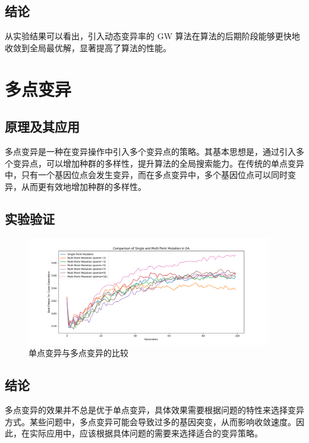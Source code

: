 \documentclass[journal=gmj]{report}%
\theoremstyle{definition}
\numberwithin{equation}{section}
\begin{document}
\subsection{结论}

从实验结果可以看出，引入动态变异率的 GW 算法在算法的后期阶段能够更快地收敛到全局最优解，显著提高了算法的性能。

\section{多点变异}

\subsection{原理及其应用}

多点变异是一种在变异操作中引入多个变异点的策略。其基本思想是，通过引入多个变异点，可以增加种群的多样性，提升算法的全局搜索能力。在传统的单点变异中，只有一个基因位点会发生变异，而在多点变异中，多个基因位点可以同时变异，从而更有效地增加种群的多样性。

\subsection{实验验证}

\begin{figure}[H]
  \centering
  \includegraphics[width=0.95\textwidth]{../assets/img/ga_comparison_mutation.png}
  \caption{单点变异与多点变异的比较}\label{fig:}
\end{figure}

\subsection{结论}

多点变异的效果并不总是优于单点变异，具体效果需要根据问题的特性来选择变异方式。某些问题中，多点变异可能会导致过多的基因突变，从而影响收敛速度。因此，在实际应用中，应该根据具体问题的需要来选择适合的变异策略。
\end{document}
